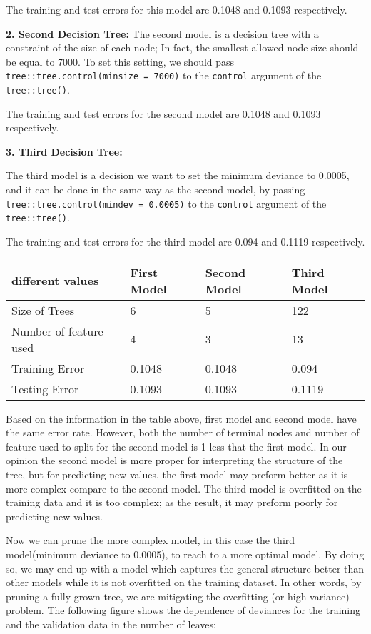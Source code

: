 \documentclass[
]{article}
\begin{document}
The training and test errors for this model are 0.1048 and 0.1093
respectively.

\textbf{2. Second Decision Tree:} The second model is a decision tree
with a constraint of the size of each node; In fact, the smallest
allowed node size should be equal to 7000. To set this setting, we
should pass \texttt{tree::tree.control(minsize\ =\ 7000)} to the
\texttt{control} argument of the \texttt{tree::tree()}.

The training and test errors for the second model are 0.1048 and 0.1093
respectively.

\textbf{3. Third Decision Tree:}

The third model is a decision we want to set the minimum deviance to
0.0005, and it can be done in the same way as the second model, by
passing \texttt{tree::tree.control(mindev\ =\ 0.0005)} to the
\texttt{control} argument of the \texttt{tree::tree()}.

The training and test errors for the third model are 0.094 and 0.1119
respectively.

\begin{longtable}[]{@{}llll@{}}
\toprule()
different values & First Model & Second Model & Third Model \\
\midrule()
\endhead
Size of Trees & 6 & 5 & 122 \\
Number of feature used & 4 & 3 & 13 \\
Training Error & 0.1048 & 0.1048 & 0.094 \\
Testing Error & 0.1093 & 0.1093 & 0.1119 \\
\bottomrule()
\end{longtable}

Based on the information in the table above, first model and second
model have the same error rate. However, both the number of terminal
nodes and number of feature used to split for the second model is 1 less
that the first model. In our opinion the second model is more proper for
interpreting the structure of the tree, but for predicting new values,
the first model may preform better as it is more complex compare to the
second model. The third model is overfitted on the training data and it
is too complex; as the result, it may preform poorly for predicting new
values.

Now we can prune the more complex model, in this case the third
model(minimum deviance to 0.0005), to reach to a more optimal model. By
doing so, we may end up with a model which captures the general
structure better than other models while it is not overfitted on the
training dataset. In other words, by pruning a fully-grown tree, we are
mitigating the overfitting (or high variance) problem. The following
figure shows the dependence of deviances for the training and the
validation data in the number of leaves:
\end{document}
